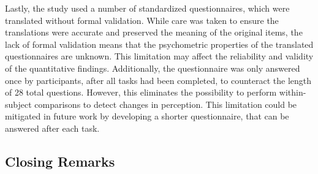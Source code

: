 Lastly, the study used a number of standardized questionnaires, which were translated without formal validation. While care was taken to ensure the translations were accurate and preserved the meaning of the original items, the lack of formal validation means that the psychometric properties of the translated questionnaires are unknown. This limitation may affect the reliability and validity of the quantitative findings. Additionally, the questionnaire was only answered once by participants, after all tasks had been completed, to counteract the length of 28 total questions. However, this eliminates the possibility to perform within-subject comparisons to detect changes in perception. This limitation could be mitigated in future work by developing a shorter questionnaire, that can be answered after each task.

\subsection{Closing Remarks} \label{ssec:closing-remarks}

